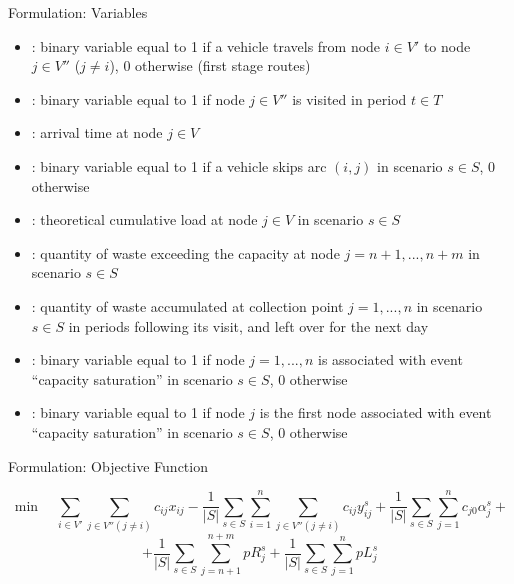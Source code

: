 \documentclass{beamer} %
\theoremstyle{definition} %
\begin{document}
\begin{frame}{Formulation: Variables}
\begin{itemize}
	\item [$x_{ij}$]: binary variable equal to 1 if a vehicle travels from node $i \in V' $ to node $j \in V''$ ($j\neq i$), $0$ otherwise (first stage routes)
	\item [$U_{jt}$]: binary variable equal to 1 if node $j\in V''$ is visited in period $t \in T$
	\item [$\bar{T}_j$]: arrival time at node $j\in V$ 
	\item  [$y_{ij}^s$]: binary variable equal to 1 if a vehicle skips arc $(i,j)$ in scenario $s \in S$, $0$ otherwise 
	\item [$Q_j^s$]: theoretical cumulative load at node $j\in V$ in scenario $s \in S$
	\item [$R_j^s$]: quantity of waste exceeding the capacity at node $j=n+1,...,n+m$ in scenario $s \in S$
	\item [$L_j^s$]: quantity of waste accumulated at collection point $j=1,...,n$ in scenario $s \in S$ in periods following its visit, and left over for the next day
	\item [$\rho_j^s$]: binary variable equal to 1 if node $j=1,...,n$ is associated with  event ``capacity saturation'' in scenario $s\in S$, $0$ otherwise 
	\item [$\alpha_j^s$]: binary variable equal to 1 if node $j$ is the first node associated with  event ``capacity saturation'' in scenario $s\in S$, $0$ otherwise
\end{itemize}
	
\end{frame}

	\begin{frame}{Formulation: Objective Function}
		\begin{block}{}
			$$
			\min \quad  \sum_{i \in V'} \sum_{j \in V'' (j\neq i)} c_{ij} {x}_{ij} - \frac{1}{|S|} \sum_{s \in S} \sum_{i=1}^n \sum_{j \in V''(j\neq i)} c_{ij} {y}_{ij}^s + \frac{1}{|S|} \sum_{s \in S} \sum_{j=1}^n  c_{j0} \alpha_j^s + 
			$$
			\begin{equation}\label{of}
				+ \frac{1}{|S|} \sum_{s \in S} \sum_{j=n+1}^{n+m}  p R_j^s + \frac{1}{|S|} \sum_{s \in S} \sum_{j=1}^n p L_j^s
			\end{equation}
			
		\end{block}
		
	\end{frame} 
\end{document}

